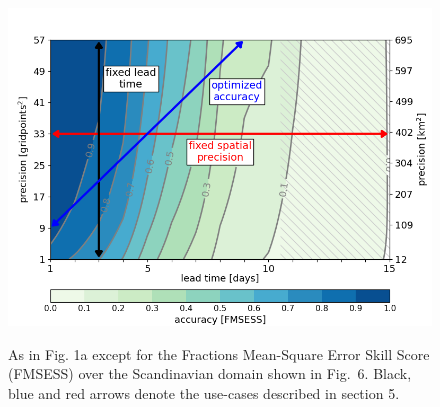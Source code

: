 \documentclass[preprint,12pt,authoryear]{elsarticle}
\begin{document}
\newpage
\begin{figure}[t]
  \noindent\includegraphics[scale=0.7]{fig_05.png}\\
  \caption{As in Fig. 1a except for the Fractions Mean-Square Error Skill Score (FMSESS) over the Scandinavian domain shown in Fig.~6. Black, blue and red arrows denote the use-cases described in section 5.} \label{f5}
\end{figure}
\end{document}
